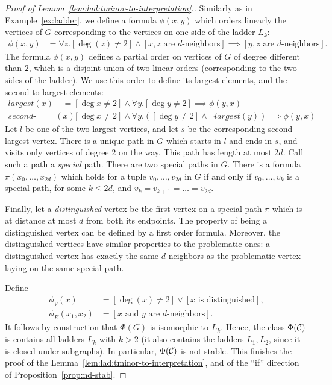 \begin{proof}[Proof of Lemma~\ref{lem:lad:tminor-to-interpretation}.]
Similarly as in Example~\ref{ex:ladder},
we define a formula $\phi(x,y)$ which orders linearly 
the vertices of $G$ corresponding to the vertices on one side of the ladder $L_k$:
\begin{align*}
  \phi(x,y)&=\forall z.[\deg(z)\neq 2]\land [x,z\text{ are $d$-neighbors}]
\implies [y,z\text{ are $d$-neighbors}].  
\end{align*}
The formula $\phi(x,y)$ defines a partial order on vertices of $G$ of degree different than $2$, which is a disjoint union of two linear orders (corresponding to the two sides of the ladder). We use this order to define its largest 
elements, and the second-to-largest elements:
\begin{align*}
  \textit{largest}(x)&=[\deg x\neq 2]\land \forall y.[\deg y\neq 2]\implies \phi(y,x)\\
  \textit{second-largest}(x)&=[\deg x\neq 2]\land \forall y.([\deg y\neq 2]\land \neg\textit{largest}(y))\implies \phi(y,x)  
\end{align*}
Let $l$ be one of the two largest vertices, and let $s$
be the corresponding second-largest vertex. There is a unique path in $G$ which starts in $l$ and ends in $s$,
and visits only vertices of degree $2$ on the way. 
This path has length at most $2d$.
Call such a path a \emph{special} path. There are two special paths in $G$. There is a formula $\pi(x_0,\ldots,x_{2d})$ which holds for a tuple $v_0,\ldots,v_{2d}$ in $G$ if and only if 
$v_0,\ldots,v_{k}$ is a special path, for some $k\le 2d$,
and $v_{k}=v_{k+1}=\ldots=v_{2d}$.

Finally, let a \emph{distinguished} vertex be the first vertex on a special path $\pi$ which is at distance at most $d$ from both its endpoints. The property of being a distinguished vertex can be defined by a first order formula. Moreover, the distinguished vertices have similar properties to the problematic ones:  a distinguished vertex has exactly the same $d$-neighbors as the problematic vertex laying on the same special path.

Define 
\begin{align*}
  \phi_V(x)&=[\deg(x)\neq 2]\lor [x\text{ is distinguished}],\\
  \phi_E(x_1,x_2)&=[\text{$x$ and $y$ are $d$-neighbors}].
\end{align*}
It follows by construction that $\Phi(G)$
is isomorphic to $L_k$.
Hence, the class $\Phi({\cal C})$ is contains all ladders $L_k$ with $k>2$ (it also contains the ladders $L_1,L_2$,
since it is closed under subgraphs). In particular, $\Phi({\cal C})$ is not stable. This finishes the proof of the Lemma~\ref{lem:lad:tminor-to-interpretation}, and of the ``if'' direction of Proposition~\ref{prop:nd-stab}.
\end{proof}

